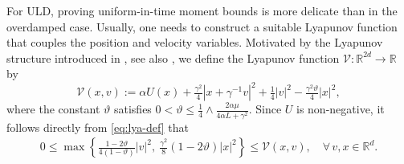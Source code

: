 \documentclass[12pt]{article}
\numberwithin{equation}{section}
\begin{document}
For ULD, proving uniform-in-time moment bounds is more delicate than in the overdamped case.
Usually, one needs to construct a suitable Lyapunov function that couples the position and velocity variables. 
Motivated by the Lyapunov structure introduced in \cite{mattingly2002ergodicity}, see also  \cite{wu2001large, eberle2019couplings},
we define the Lyapunov function $\mathcal{V}: \mathbb{R}^{2d} \to \mathbb{R}$ by
\begin{equation}
\label{eq:lya-def}
    \mathcal{V}(x, v) := \alpha U(x) + 
    \tfrac{\gamma^2}{4}
    |x 
    +
    \gamma^{-1}
    v
    |^2
    +
\tfrac{1}{4}
    |v
    |^2
    -\tfrac{\gamma^2\vartheta}{4}
    |x|^2
    ,
\end{equation}
where the constant $\vartheta$ satisfies $0 < \vartheta \leq \frac{1}{4} \wedge \frac{2\alpha\mu}{4\alpha L + \gamma^2}$. 
Since $U$ is non-negative, it follows directly from \eqref{eq:lya-def} that
\begin{align}\label{eq:lya-geq}
    0 \leq \max\left\{ \tfrac{1 - 2\vartheta}{4(1 - \vartheta)} |v|^2,\ \tfrac{\gamma^2}{8}(1 - 2\vartheta) |x|^2 \right\} \leq \mathcal{V}(x, v),\quad 
    \forall \, v, x \in \mathbb{R}^d.
\end{align}
\end{document}
